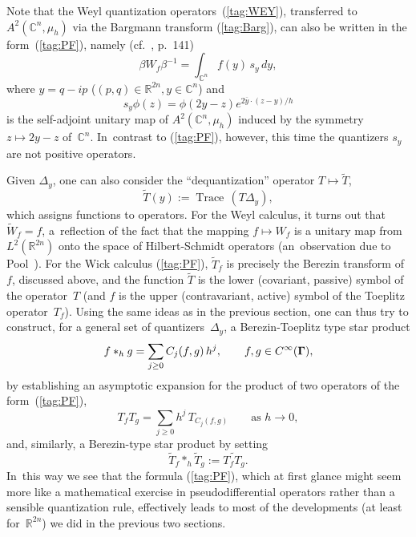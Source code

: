 \documentclass[11pt]{amsart}
\numberwithin{equation}{section}
\theoremstyle{remark}
\newcommand\Omg{{\bigam}}   %
\newcommand\RR{\mathbb R}
\newcommand{\CC}{\C}
\newcommand{\bigam}{\mbox{\boldmath $\Gamma$}}
\newcommand{\C}{\mathbb C}
\begin{document}
Note that the Weyl quantization operators~(\ref{tag:WEY}), transferred to
$A^2(\CC^n,\mu_h)$ via the Bargmann transform (\ref{tag:Barg}), can also be
written in  the form~(\ref{tag:PF}), namely (cf.~\cite{bib:Foll}, p.~141)
\begin{equation}  \beta W_f \beta^{-1} = \int_{\CC^n} f(y) \, s_y \, dy ,
\label{tag:PW}  \end{equation}
where $y=q-ip$ ($(p,q)\in\RR^{2n},y\in\CC^n$) and
$$ s_y \phi(z) = \phi(2y-z) e^{2\overline y\cdot(z-y)/h} $$
is the self-adjoint unitary map of $A^2(\CC^n,\mu_h)$ induced by the symmetry
$z\mapsto 2y-z$ of~$\CC^n$. In~contrast to (\ref{tag:PF}), however, this time
the quantizers $s_y$ are not positive operators.

Given $\Delta_y$, one can also consider the ``dequantization'' operator
$T\mapsto\tilde T$,
\begin{equation}  \tilde T(y) := \operatorname{Trace} \, (T\Delta_y),
\label{tag:PG}  \end{equation}
which assigns functions to operators. For the Weyl calculus, it turns out that
$\tilde W_f=f$, a~reflection of the fact that the mapping $f\mapsto W_f$ is a
unitary map from  $L^2(\RR^{2n})$ onto the space of Hilbert-Schmidt operators
(an~observation due to Pool~\cite{bib:Pool}). For the Wick calculus
(\ref{tag:PF}), $\tilde T_f$ is precisely the Berezin transform of~$f$,
discussed above, and the function $\tilde T$ is the lower (covariant, passive)
symbol of the operator~$T$ (and $f$ is the upper (contravariant, active) symbol
of the Toeplitz operator~$T_f$). Using the same ideas as in the previous
section, one can thus try to construct, for a general set of
quantizers~$\Delta_y$, a Berezin-Toeplitz type star product
$$ f *_h g = \sum_{j\ge0} C_j(f,g) \, h^j, \qquad f,g\in C^\infty(\Omg),  $$
by establishing an asymptotic expansion for the product of two operators of the
form~(\ref{tag:PF}),
$$ T_f T_g = \sum_{j\ge0} h^j \, T_{C_j(f,g)} \qquad\text{as }h\to0,  $$
and, similarly, a Berezin-type star product by setting
$$ \tilde T_f *_h \tilde T_g := \widetilde{T_f T_g}.  $$
In~this way we see that the formula (\ref{tag:PF}), which at first glance might
seem more like a mathematical exercise in pseudodifferential operators rather
than a sensible quantization rule, effectively leads to most of the
developments (at least for~$\RR^{2n}$) we did in the previous two sections.
\end{document}
